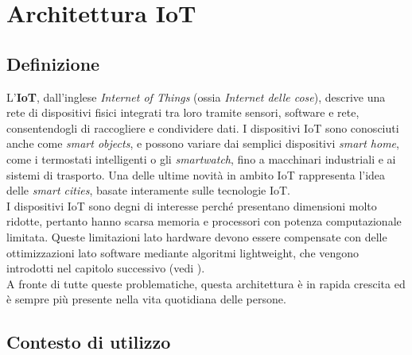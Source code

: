 \chapter{Architettura IoT}

\section{Definizione}

L'\textbf{IoT}, dall'inglese \textit{Internet of Things} (ossia \textit{Internet delle cose}), descrive una rete di dispositivi fisici integrati tra loro tramite sensori, software e rete, consentendogli di raccogliere e condividere dati. I dispositivi IoT sono conosciuti anche come \textit{smart objects}, e possono variare dai semplici dispositivi \textit{smart home}, come i termostati intelligenti o gli \textit{smartwatch}, fino a macchinari industriali e ai sistemi di trasporto. Una delle ultime novità in ambito IoT rappresenta l'idea delle \textit{smart cities}, basate interamente sulle tecnologie IoT\cite{iot-intro}. \\

\noindent I dispositivi IoT sono degni di interesse perché presentano dimensioni molto ridotte, pertanto hanno scarsa memoria e processori con potenza computazionale limitata. Queste limitazioni lato hardware devono essere compensate con delle ottimizzazioni lato software mediante algoritmi lightweight, che vengono introdotti nel capitolo successivo (vedi ). \\

\noindent A fronte di tutte queste problematiche, questa architettura è in rapida crescita ed è sempre più presente nella vita quotidiana delle persone.

\section{Contesto di utilizzo}

